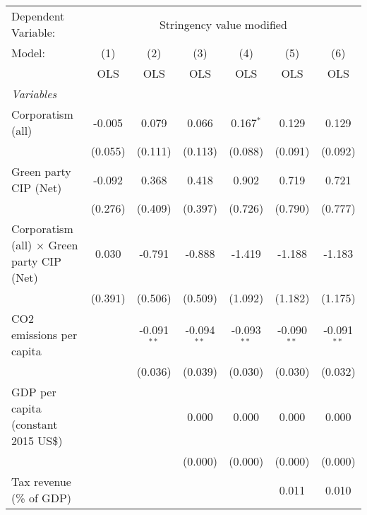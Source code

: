 
\begingroup
\centering
\begin{tabular}{lcccccc}
   \toprule
   Dependent Variable: & \multicolumn{6}{c}{Stringency value modified}\\
   Model:                                            & (1)     & (2)           & (3)           & (4)           & (5)           & (6)\\  
                                                     &  OLS    & OLS           & OLS           & OLS           & OLS           & OLS\\  
   \midrule
   \emph{Variables}\\
   Corporatism (all)                                 & -0.005  & 0.079         & 0.066         & 0.167$^{*}$   & 0.129         & 0.129\\   
                                                     & (0.055) & (0.111)       & (0.113)       & (0.088)       & (0.091)       & (0.092)\\   
   Green party CIP (Net)                             & -0.092  & 0.368         & 0.418         & 0.902         & 0.719         & 0.721\\   
                                                     & (0.276) & (0.409)       & (0.397)       & (0.726)       & (0.790)       & (0.777)\\   
   Corporatism (all) $\times$ Green party CIP (Net)  & 0.030   & -0.791        & -0.888        & -1.419        & -1.188        & -1.183\\   
                                                     & (0.391) & (0.506)       & (0.509)       & (1.092)       & (1.182)       & (1.175)\\   
   CO2 emissions per capita                          &         & -0.091$^{**}$ & -0.094$^{**}$ & -0.093$^{**}$ & -0.090$^{**}$ & -0.091$^{**}$\\   
                                                     &         & (0.036)       & (0.039)       & (0.030)       & (0.030)       & (0.032)\\   
   GDP per capita (constant 2015 US\$)               &         &               & 0.000         & 0.000         & 0.000         & 0.000\\   
                                                     &         &               & (0.000)       & (0.000)       & (0.000)       & (0.000)\\   
   Tax revenue (\% of GDP)                           &         &               &               &               & 0.011         & 0.010\\   

\end{tabular}
